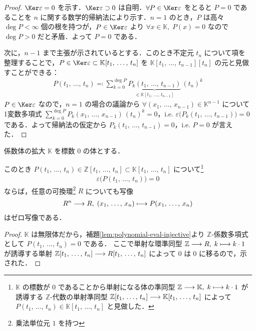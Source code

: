 \documentclass[TQFT_main]{subfiles}
\begin{document}
\begin{proof}
    $\Ker \varepsilon = 0$ を示す．$\Ker \varepsilon \supset 0$ は自明．$\forall P \in \Ker \varepsilon$ をとると $P = 0$ であることを $n$ に関する数学的帰納法により示す．$n=1$ のとき，$P$ は高々 $\deg P < \infty$ 個の根を持つが，$P \in \Ker \varepsilon$ より $\forall x \in \mathbb{K},\; P(x) = 0$ なので $\deg P > 0$ だと矛盾．よって $P = 0$ である．

    次に，$n-1$ まで主張が示されているとする．このとき不定元 $t_n$ について項を整理することで，$P \in \Ker \varepsilon \subset \mathbb{K}[t_1,\, \dots,\, t_n]$ を $\mathbb{K}[t_1,\, \dots,\, t_{n-1}][t_n]$ の元と見做すことができる：
    \begin{align}
        P(t_1,\, \dots,\, t_n) \eqqcolon \sum_{k=0}^{\deg P} \underbrace{P_k(t_1,\, \dots,\, t_{n-1})}_{\in \mathbb{K}[t_1,\, \dots,\, t_{n-1}]}\, (t_n)^k
    \end{align}
    $P \in \Ker \varepsilon$ なので，$n=1$ の場合の議論から $\forall (x_1,\, \dots,\, x_{n-1}) \in \mathbb{K}^{n-1}$ について1変数多項式 $\sum_{k=0}^{\deg P} P_k(x_1,\, \dots,\, x_{n-1})\, (t_n)^k=0$，i.e. $\varepsilon\bigl(P_k(t_1,\, \dots,\, t_{n-1})\bigr) = 0$ である．よって帰納法の仮定から $P_k(t_1,\, \dots,\, t_{n-1}) = 0$，i.e. $P = 0$ が言えた．
\end{proof}

\begin{mylem}[label=lem:Z-extension]{係数体の拡大}
    $\mathbb{K}$ を標数 $0$ の体とする．
    
    このとき $P(t_1,\, \dots,\, t_{n}) \in \mathbb{Z}[t_1,\, \dots,\, t_{n}] \subset \mathbb{K}[t_1,\, \dots,\, t_{n}]$ について\footnote{$\mathbb{K}$ の標数が $0$ であることから単射になる体の準同型 $\mathbb{Z} \longrightarrow \mathbb{K},\; k \longmapsto k \cdot 1$ が誘導する $\mathbb{Z}$-代数の単射準同型 $\mathbb{Z}[t_1,\, \dots,\, t_n] \longrightarrow \mathbb{K}[t_1,\, \dots,\, t_n]$ によって $P(t_1,\, \dots,\, t_n) \in \mathbb{K}[t_1,\, \dots,\, t_n]$ と見做した．}
    \begin{align}
        \varepsilon \bigl( P(t_1,\, \dots,\, t_{n}) \bigr) = 0
    \end{align}
    ならば，任意の可換環\footnote{乗法単位元 $1$ を持つ} $R$ についても写像
    \begin{align}
         R^n \longrightarrow R,\; (x_1,\, \dots,\, x_n) \longmapsto P(x_1,\, \dots,\, x_n)
    \end{align}
    はゼロ写像である．
\end{mylem}

\begin{proof}
    $\mathbb{K}$ は無限体だから，補題\ref{lem:polynomial-eval-injective}より $\mathbb{Z}$-係数多項式として $P(t_1,\, \dots,\, t_{n}) = 0$ である．
    ここで単射な環準同型 $\mathbb{Z} \longrightarrow R,\; k \longmapsto k \cdot 1$ が誘導する単射 $\mathbb{Z}[t_1,\, \dots,\, t_{n}] \longrightarrow R[t_1,\, \dots,\, t_{n}]$ によって $0$ は $0$ に移るので，示された．
\end{proof}
\end{document}
